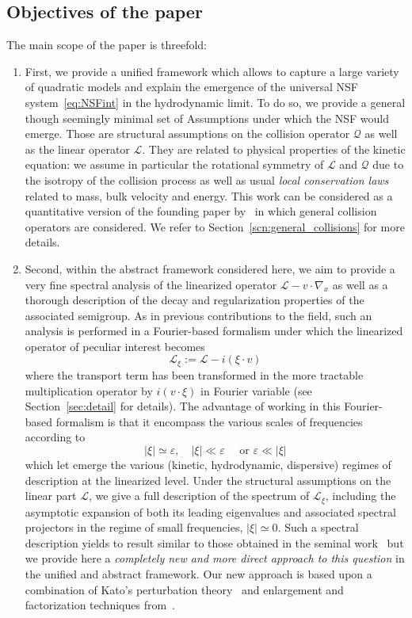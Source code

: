 \documentclass[AHL,Unicode,longabstracts,published]{cedram}
\newcommand{\LL}{\mathcal{L}}
\newcommand{\QQ}{\mathcal{Q}}
\newcommand*\eps{{\varepsilon}}
\newcommand*{\relabel}{\renewcommand{\labelenumi}{(\theenumi)}}
\newcommand*{\Romanebfnumi}{\renewcommand*{\theenumi}{\textbf{\Roman{enumi}}}\relabel}
\begin{document}
\subsection{Objectives of the paper}

The main scope of the paper is threefold:
\begin{enumerate}\Romanebfnumi
\item\label{I} First, we provide a unified framework which allows to capture a large variety of quadratic models and explain the emergence of the universal NSF system~\eqref{eq:NSFint} in the hydrodynamic limit. To do so, we provide a general though seemingly minimal set of Assumptions under which the NSF would emerge. Those are structural assumptions on the collision operator $\QQ$ as well as the linear operator $\LL$. They are related to physical properties of the kinetic equation: we assume in particular the rotational symmetry of $\LL$ and $\QQ$ due to the isotropy of the collision process as well as usual \emph{local conservation laws} related to mass, bulk velocity and energy. This work can be considered as a quantitative version of the founding paper by~\cite{BaGoLe1} in which general collision operators are considered. We refer to Section~\ref{scn:general_collisions} for more details.
\item\label{II} Second, within the abstract framework considered here, we aim to provide a very fine spectral analysis of the linearized operator $\LL-v\cdot \nabla_{x}$ as well as a thorough description of the decay {and regularization} properties of the associated semigroup. As in previous contributions to the field, such an analysis is performed in a Fourier-based formalism under which the linearized operator of peculiar interest becomes
\[
\LL_{\xi}:=\LL-i(\xi\cdot v)
\]
where the transport term has been transformed in the more tractable multiplication operator by $i(v\cdot \xi)$ in Fourier variable (see Section~\ref{sec:detail} for details). The advantage of working in this Fourier-based formalism is that it encompass the various scales of frequencies according to
\[
|\xi| \simeq \eps, \quad |\xi| \ll \eps \quad \text{ or } \eps \ll |\xi|
\]
which let emerge the various (kinetic, hydrodynamic, dispersive) regimes of description at the linearized level. Under the structural assumptions on the linear part $\LL$, we give a full description of the spectrum of $\LL_{\xi}$, including the asymptotic expansion of both its leading eigenvalues and associated spectral projectors in the regime of small frequencies, $|\xi| \simeq 0$. Such a spectral description yields to result similar to those obtained in the seminal work~\cite{EP1975} but we provide here a \emph{completely new and more direct approach to this question} in the unified and abstract framework. Our new approach is based upon a combination of Kato's perturbation theory~\cite{K1995} and enlargement and factorization techniques from~\cite{GMM2017}.



\end{enumerate}
\end{document}
